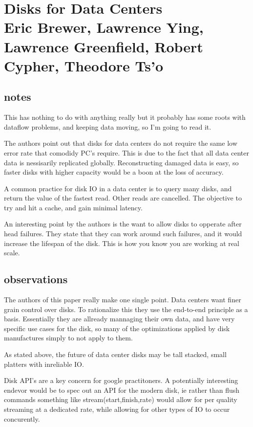 \section{Disks for Data Centers \\ \small{Eric Brewer, Lawrence Ying, Lawrence
Greenfield, Robert Cypher, Theodore Ts'o}}

\subsection{notes}

This has nothing to do with anything really but it probably has some roots with
dataflow problems, and keeping data moving, so I'm going to read it.

The authors point out that disks for data centers do not require the same low
error rate that comodidy PC's require. This is due to the fact that all data
center data is nessisarily replicated globally. Reconstructing damaged data is
easy, so faster disks with higher capacity would be a boon at the loss of
accuracy.

A common practice for disk IO in a data center is to query many disks, and
return the value of the fastest read. Other reads are cancelled. The objective
to try and hit a cache, and gain minimal latency.

An interesting point by the authors is the want to allow disks to opperate
after head failures. They state that they can work around such failures, and it
would increase the lifespan of the disk. This is how you know you are working
at real scale.

\subsection{observations}

The authors of this paper really make one single point. Data centers want finer
grain control over disks. To rationalize this they use the end-to-end principle
as a basis. Essentially they are allready mannaging their own data, and have
very specific use cases for the disk, so many of the optimizations applied by
disk manufactures simply to not apply to them.

As stated above, the future of data center disks may be tall stacked, small
platters with inreliable IO.

Disk API's are a key concern for google practitoners. A potentially interesting
endevor would be to spec out an API for the modern disk, ie rather than flush
commands something like stream(start,finish,rate) would allow for per quality
streaming at a dedicated rate, while allowing for other types of IO to occur
concurently.

